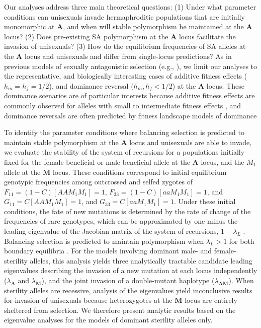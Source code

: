 \documentclass[9pt,twocolumn,twoside,lineno]{gsajnl}
\begin{document}
Our analyses address three main theoretical questions: (1) Under what parameter conditions can unisexuals invade hermaphroditic populations that are initially monomorphic at $\mathbf{A}$, and when will stable polymorphism be maintained at the $\mathbf{A}$ locus? (2) Does pre-existing SA polymorphism at the $\mathbf{A}$ locus facilitate the invasion of unisexuals? (3) How do the equilibrium frequencies of SA alleles at the $\mathbf{A}$ locus and unisexuals and differ from single-locus predictions? As in previous models of sexually antagonistic selection (e.g., \citealp{Kidwell1977,Prout2000,JordanConnallon2014}), we limit our analyses to the representative, and biologically interesting cases of additive fitness effects ($h_m = h_f = 1/2$), and dominance reversal ($h_m, h_f < 1/2$) at the $\mathbf{A}$ locus. These dominance scenarios are of particular interests because additive fitness effects are commonly observed for alleles with small to intermediate fitness effects \citep{Agrawal2011}, and dominance reversals are often predicted by fitness landscape models of dominance \citep{Manna2011, ConnallonClark2014}

To identify the parameter conditions where balancing selection is predicted to maintain stable polymorphism at the $\mathbf{A}$ locus and unisexuals are able to invade, we evaluate the stability of the system of recursions for a populations initially fixed for the female-beneficial or male-beneficial allele at the $\mathbf{A}$ locus, and the $M_1$ allele at the $\mathbf{M}$ locus. These conditions correspond to initial equilibrium genotypic frequencies among outcrossed and selfed zygotes of $F_{11} = (1 - C) [AAM_1M_1] = 1$, $F_{33} = (1 - C) [aaM_1M_1] = 1$, and $G_{11} = C [AAM_1M_1] = 1$, and $G_{33} = C [aaM_1M_1] = 1$. Under these initial conditions, the fate of new mutations is determined by the rate of change of the frequencies of rare genotypes, which can be approximated by one minus the leading eigenvalue of the Jacobian matrix of the system of recursions, $1 - \lambda_L$ \citep{OttoDay2007}. Balancing selection is predicted to maintain polymorphism when $\lambda_L > 1$ for both boundary equilibria \citep{Prout1968,OttoDay2007}. For the models involving dominant male- and female-sterility alleles, this analysis yields three analytically tractable candidate leading eigenvalues describing the invasion of a new mutation at each locus independently ($\lambda_\mathbf{A}$ and $\lambda_\mathbf{M}$), and the joint invasion of a double-mutant haplotype ($\lambda_\mathbf{AM}$). When sterility alleles are recessive, analysis of the eigenvalues yield inconclusive results for invasion of unisexuals because heterozygotes at the $\mathbf{M}$ locus are entirely sheltered from selection. We therefore present analytic results based on the eigenvalue analyses for the models of dominant sterility alleles only.
\end{document}
